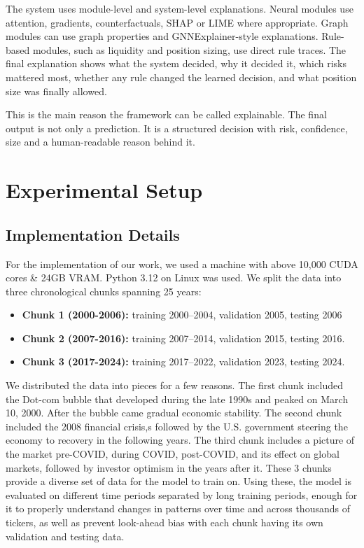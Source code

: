 \documentclass[conference]{IEEEtran}
\begin{document}
The system uses module-level and system-level explanations. Neural modules use attention, gradients, counterfactuals, SHAP\cite{SHAP} or LIME\cite{LIME} where appropriate. Graph modules can use graph properties and GNNExplainer-style explanations. Rule-based modules, such as liquidity and position sizing, use direct rule traces. The final explanation shows what the system decided, why it decided it, which risks mattered most, whether any rule changed the learned decision, and what position size was finally allowed.

This is the main reason the framework can be called explainable. The final output is not only a prediction. It is a structured decision with risk, confidence, size and a human-readable reason behind it.

\section{Experimental Setup}
 
\subsection{Implementation Details}
For the implementation of our work, we used a machine with above 10,000 CUDA cores \& 24GB VRAM. Python 3.12 on Linux was used. We split the data into three chronological chunks spanning 25 years:
\begin{itemize}
  \item \textbf{Chunk 1 (2000-2006):} training 2000–2004, validation 2005, testing 2006 
  \item \textbf{Chunk 2 (2007-2016):} training 2007–2014, validation 2015, testing 2016. 
  \item \textbf{Chunk 3 (2017-2024):} training 2017–2022, validation 2023, testing 2024. 
\end{itemize}
We distributed the data into pieces for a few reasons. The first chunk included the Dot-com bubble that developed during the late 1990s and peaked on March 10, 2000.\cite{dotcomBubble} After the bubble came gradual economic stability. The second chunk included the 2008 financial crisis,s followed by the U.S. government steering the economy to recovery in the following years. The third chunk includes a picture of the market pre-COVID, during COVID, post-COVID, and its effect on global markets, followed by investor optimism in the years after it. These 3 chunks provide a diverse set of data for the model to train on. Using these, the model is evaluated on different time periods separated by long training periods, enough for it to properly understand changes in patterns over time and across thousands of tickers, as well as prevent look-ahead bias with each chunk having its own validation and testing data. 
\end{document}
